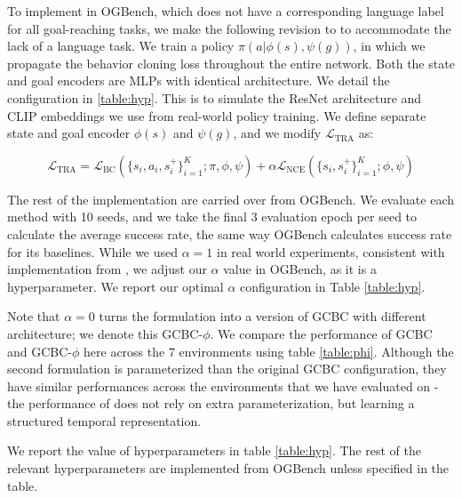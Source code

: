 To implement \Method{} in OGBench, which does not have a corresponding language label for all goal-reaching tasks, we make the following revision to \Method{} to accommodate the lack of a language task.
We train a policy $\pi(a|\phi(s), \psi(g))$, in which we propagate the behavior cloning loss throughout the entire network.
Both the state and goal encoders are MLPs with identical architecture.
We detail the configuration in \ref{table:hyp}.
This is to simulate the ResNet architecture and CLIP embeddings we use from real-world policy training.
We define separate state and goal encoder $\phi(s)$ and $\psi(g)$, and we modify $\mathcal{L}_\text{TRA}$ as:

\begin{equation}
    \mathcal{L}_\text{TRA} = \mathcal{L}_\text{BC}(\{s_i, a_i, s_i^+\}_{i=1}^K; \pi, \phi, \psi) + \alpha \mathcal{L}_\text{NCE}(\{s_i, s_i^+\}_{i=1}^K; \phi, \psi)
\end{equation}

The rest of the implementation are carried over from OGBench. We evaluate each method with 10 seeds, and we take the final 3 evaluation epoch per seed to calculate the average success rate, the same way OGBench calculates success rate for its baselines. While we used $\alpha=1$ in real world experiments, consistent with implementation from \cite{myers2023goal}, we adjust our $\alpha$ value in OGBench, as it is a hyperparameter. We report our optimal $\alpha$ configuration in Table \ref{table:hyp}.

Note that $\alpha=0$ turns the formulation into a version of GCBC with different architecture; we denote this GCBC-$\phi$.
We compare the performance of GCBC and GCBC-$\phi$ here across the 7 environments using table \ref{table:phi}.
Although the second formulation is parameterized than the original GCBC configuration, they have similar performances across the environments that we have evaluated on \-- the performance of \Method{} does not rely on extra parameterization, but learning a structured temporal representation.

We report the value of hyperparameters in table \ref{table:hyp}. The rest of the relevant hyperparameters are implemented from OGBench unless specified in the table.


